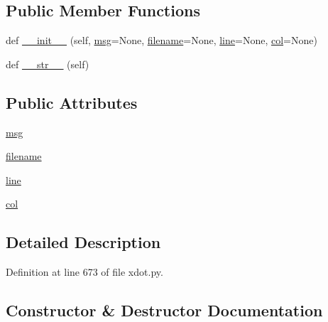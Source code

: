 \subsection*{Public Member Functions}
\begin{DoxyCompactItemize}
\item 
def \hyperlink{classsmacc__viewer_1_1xdot_1_1xdot_1_1ParseError_a5e5fcb81709f25c01cee8032fa16522b}{\+\_\+\+\_\+init\+\_\+\+\_\+} (self, \hyperlink{classsmacc__viewer_1_1xdot_1_1xdot_1_1ParseError_a66bf73a283893791d4e586bfc7846c64}{msg}=None, \hyperlink{classsmacc__viewer_1_1xdot_1_1xdot_1_1ParseError_a90306db99316d7fa8ea0c22dd4d7b4e1}{filename}=None, \hyperlink{classsmacc__viewer_1_1xdot_1_1xdot_1_1ParseError_a505ce84cf3c75c01a0f33854ffbefe74}{line}=None, \hyperlink{classsmacc__viewer_1_1xdot_1_1xdot_1_1ParseError_ad05fe80da8e8cead11744886782e19d8}{col}=None)
\item 
def \hyperlink{classsmacc__viewer_1_1xdot_1_1xdot_1_1ParseError_a3a51192634590a8fcb86fe066f64983f}{\+\_\+\+\_\+str\+\_\+\+\_\+} (self)
\end{DoxyCompactItemize}
\subsection*{Public Attributes}
\begin{DoxyCompactItemize}
\item 
\hyperlink{classsmacc__viewer_1_1xdot_1_1xdot_1_1ParseError_a66bf73a283893791d4e586bfc7846c64}{msg}
\item 
\hyperlink{classsmacc__viewer_1_1xdot_1_1xdot_1_1ParseError_a90306db99316d7fa8ea0c22dd4d7b4e1}{filename}
\item 
\hyperlink{classsmacc__viewer_1_1xdot_1_1xdot_1_1ParseError_a505ce84cf3c75c01a0f33854ffbefe74}{line}
\item 
\hyperlink{classsmacc__viewer_1_1xdot_1_1xdot_1_1ParseError_ad05fe80da8e8cead11744886782e19d8}{col}
\end{DoxyCompactItemize}


\subsection{Detailed Description}


Definition at line 673 of file xdot.\+py.



\subsection{Constructor \& Destructor Documentation}
